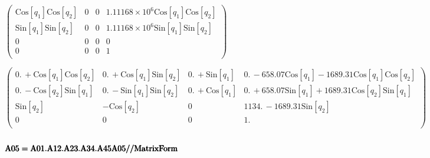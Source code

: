 \documentclass{article}
\begin{document}
\begin{doublespace}
\noindent\(\left(
\begin{array}{cccc}
 \text{Cos}\left[q_1\right] \text{Cos}\left[q_2\right] & 0 & 0 & 1.11168\times 10^6 \text{Cos}\left[q_1\right] \text{Cos}\left[q_2\right] \\
 \text{Sin}\left[q_1\right] \text{Sin}\left[q_2\right] & 0 & 0 & 1.11168\times 10^6 \text{Sin}\left[q_1\right] \text{Sin}\left[q_2\right] \\
 0 & 0 & 0 & 0 \\
 0 & 0 & 0 & 1 \\
\end{array}
\right)\)
\end{doublespace}

\begin{doublespace}
\noindent\(\left(
\begin{array}{cccc}
 0.\, +\text{Cos}\left[q_1\right] \text{Cos}\left[q_2\right] & 0.\, +\text{Cos}\left[q_1\right] \text{Sin}\left[q_2\right] & 0.\, +\text{Sin}\left[q_1\right]
& 0.\, -658.07 \text{Cos}\left[q_1\right]-1689.31 \text{Cos}\left[q_1\right] \text{Cos}\left[q_2\right] \\
 0.\, -\text{Cos}\left[q_2\right] \text{Sin}\left[q_1\right] & 0.\, -\text{Sin}\left[q_1\right] \text{Sin}\left[q_2\right] & 0.\, +\text{Cos}\left[q_1\right]
& 0.\, +658.07 \text{Sin}\left[q_1\right]+1689.31 \text{Cos}\left[q_2\right] \text{Sin}\left[q_1\right] \\
 \text{Sin}\left[q_2\right] & -\text{Cos}\left[q_2\right] & 0 & 1134.\, -1689.31 \text{Sin}\left[q_2\right] \\
 0 & 0 & 0 & 1. \\
\end{array}
\right)\)
\end{doublespace}

\begin{doublespace}
\noindent\(\pmb{\text{}}\)
\end{doublespace}

\begin{doublespace}
\noindent\(\pmb{\text{}}\\
\pmb{\text{A05}=\text{A01}.\text{A12}.\text{A23}.\text{A34}.\text{A45}}\\
\pmb{\text{A05}\text{//}\text{MatrixForm}}\)
\end{doublespace}
\end{document}
